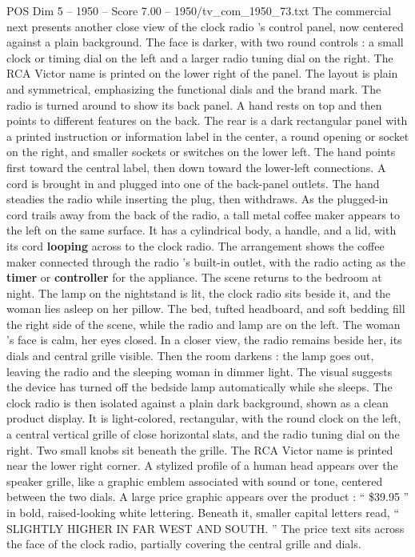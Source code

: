 \begin{textsample}{POS Dim 5 – 1950 – Score 7.00 – 1950/tv\_com\_1950\_73.txt}
The commercial next presents another close view of the clock radio ’s control panel, now centered against a plain background.
The face is darker, with two round controls : a small clock or timing dial on the left and a larger radio tuning dial on the right.
The RCA Victor name is printed on the lower right of the panel.
The layout is plain and symmetrical, emphasizing the functional dials and the brand mark.
The radio is turned around to show its back panel.
A hand rests on top and then points to different features on the back.
The rear is a dark rectangular panel with a printed instruction or information label in the center, a round opening or socket on the right, and smaller sockets or switches on the lower left.
The hand points first toward the central label, then down toward the lower-left connections.
A cord is brought in and plugged into one of the back-panel outlets.
The hand steadies the radio while inserting the plug, then withdraws.
As the plugged-in cord trails away from the back of the radio, a tall metal coffee maker appears to the left on the same surface.
It has a cylindrical body, a handle, and a lid, with its cord \textbf{looping} across to the clock radio.
The arrangement shows the coffee maker connected through the radio ’s built-in outlet, with the radio acting as the \textbf{timer} or \textbf{controller} for the appliance.
The scene returns to the bedroom at night.
The lamp on the nightstand is lit, the clock radio sits beside it, and the woman lies asleep on her pillow.
The bed, tufted headboard, and soft bedding fill the right side of the scene, while the radio and lamp are on the left.
The woman ’s face is calm, her eyes closed.
In a closer view, the radio remains beside her, its dials and central grille visible.
Then the room darkens : the lamp goes out, leaving the radio and the sleeping woman in dimmer light.
The visual suggests the device has turned off the bedside lamp automatically while she sleeps.
The clock radio is then isolated against a plain dark background, shown as a clean product display.
It is light-colored, rectangular, with the round clock on the left, a central vertical grille of close horizontal slats, and the radio tuning dial on the right.
Two small knobs sit beneath the grille.
The RCA Victor name is printed near the lower right corner.
A stylized profile of a human head appears over the speaker grille, like a graphic emblem associated with sound or tone, centered between the two dials.
A large price graphic appears over the product : “ \$39.95 ” in bold, raised-looking white lettering.
Beneath it, smaller capital letters read, “ SLIGHTLY HIGHER IN FAR WEST AND SOUTH. ” The price text sits across the face of the clock radio, partially covering the central grille and dials.

\end{textsample}
